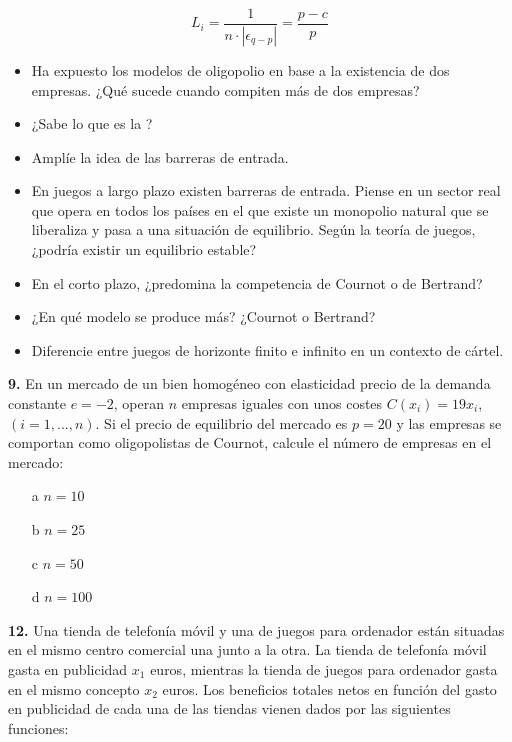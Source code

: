 \documentclass{nuevotema}
\begin{document}
\begin{equation*}
	L_i = \frac{1}{n \cdot \left| \epsilon_{q-p} \right|} = \frac{p - c}{p}
\end{equation*}



\preguntas

\begin{itemize}
    \item Ha expuesto los modelos de oligopolio en base a la existencia de dos empresas. ¿Qué sucede cuando compiten más de dos empresas?
    \item ¿Sabe lo que es la ?
    \item Amplíe la idea de las barreras de entrada.
    \item En juegos a largo plazo existen barreras de entrada. Piense en un sector real que opera en todos los países en el que existe un monopolio natural que se liberaliza y pasa a una situación de equilibrio. Según la teoría de juegos, ¿podría existir un equilibrio estable?
    \item En el corto plazo, ¿predomina la competencia de Cournot o de Bertrand?
    \item ¿En qué modelo se produce más? ¿Cournot o Bertrand?
    \item Diferencie entre juegos de horizonte finito e infinito en un contexto de cártel.
\end{itemize}


\textbf{9.} En un mercado de un bien homogéneo con elasticidad precio de la demanda constante $e=-2$, operan $n$ empresas iguales con unos costes $C(x_i) = 19x_i$, $(i=1,...,n)$. Si el precio de equilibrio del mercado es $p=20$ y las empresas se comportan como oligopolistas de Cournot, calcule el número de empresas en el mercado:

\begin{itemize}
	\item[a] $n=10$
	\item[b] $n=25$
	\item[c] $n=50$
	\item[d] $n=100$
\end{itemize}

\textbf{12.} Una tienda de telefonía móvil y una de juegos para ordenador están situadas en el mismo centro comercial una junto a la otra. La tienda de telefonía móvil gasta en publicidad $x_1$ euros, mientras la tienda de juegos para ordenador gasta en el mismo concepto $x_2$ euros. Los beneficios totales netos en función del gasto en publicidad de cada una de las tiendas vienen dados por las siguientes funciones:
\end{document}
